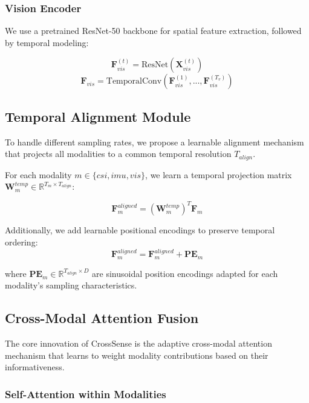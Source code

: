 \documentclass[10pt,twocolumn]{article}
\begin{document}
\subsubsection{Vision Encoder}

We use a pretrained ResNet-50 backbone for spatial feature extraction, followed by temporal modeling:

\begin{equation}
\mathbf{F}_{vis}^{(t)} = \text{ResNet}(\mathbf{X}_{vis}^{(t)})
\end{equation}
\begin{equation}
\mathbf{F}_{vis} = \text{TemporalConv}(\mathbf{F}_{vis}^{(1)}, ..., \mathbf{F}_{vis}^{(T_v)})
\end{equation}

\subsection{Temporal Alignment Module}

To handle different sampling rates, we propose a learnable alignment mechanism that projects all modalities to a common temporal resolution $T_{align}$.

For each modality $m \in \{csi, imu, vis\}$, we learn a temporal projection matrix $\mathbf{W}_m^{temp} \in \mathbb{R}^{T_m \times T_{align}}$:

\begin{equation}
\mathbf{F}_m^{aligned} = (\mathbf{W}_m^{temp})^T \mathbf{F}_m
\end{equation}

Additionally, we add learnable positional encodings to preserve temporal ordering:
\begin{equation}
\mathbf{F}_m^{aligned} = \mathbf{F}_m^{aligned} + \mathbf{PE}_m
\end{equation}

where $\mathbf{PE}_m \in \mathbb{R}^{T_{align} \times D}$ are sinusoidal position encodings adapted for each modality's sampling characteristics.

\subsection{Cross-Modal Attention Fusion}

The core innovation of CrossSense is the adaptive cross-modal attention mechanism that learns to weight modality contributions based on their informativeness.

\subsubsection{Self-Attention within Modalities}
\end{document}

